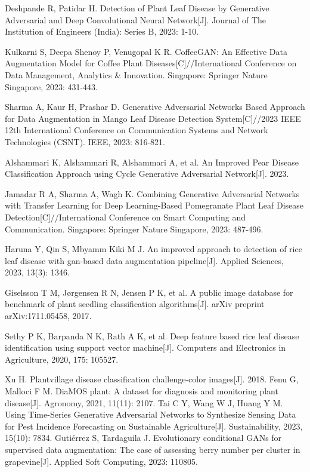 \documentclass[preprint,12pt,authoryear]{elsarticle}
\begin{document}
\begin{thebibliography}{00}
 Deshpande R, Patidar H. Detection of Plant Leaf Disease by Generative Adversarial and Deep Convolutional Neural Network[J]. Journal of The Institution of Engineers (India): Series B, 2023: 1-10.

 Kulkarni S, Deepa Shenoy P, Venugopal K R. CoffeeGAN: An Effective Data Augmentation Model for Coffee Plant Diseases[C]//International Conference on Data Management, Analytics \& Innovation. Singapore: Springer Nature Singapore, 2023: 431-443.

 Sharma A, Kaur H, Prashar D. Generative Adversarial Networks Based Approach for Data Augmentation in Mango Leaf Disease Detection System[C]//2023 IEEE 12th International Conference on Communication Systems and Network Technologies (CSNT). IEEE, 2023: 816-821.

 Alshammari K, Alshammari R, Alshammari A, et al. An Improved Pear Disease Classification Approach using Cycle Generative Adversarial Network[J]. 2023.

 Jamadar R A, Sharma A, Wagh K. Combining Generative Adversarial Networks with Transfer Learning for Deep Learning-Based Pomegranate Plant Leaf Disease Detection[C]//International Conference on Smart Computing and Communication. Singapore: Springer Nature Singapore, 2023: 487-496.

 Haruna Y, Qin S, Mbyamm Kiki M J. An improved approach to detection of rice leaf disease with gan-based data augmentation pipeline[J]. Applied Sciences, 2023, 13(3): 1346.

 Giselsson T M, Jørgensen R N, Jensen P K, et al. A public image database for benchmark of plant seedling classification algorithms[J]. arXiv preprint arXiv:1711.05458, 2017.

 Sethy P K, Barpanda N K, Rath A K, et al. Deep feature based rice leaf disease identification using support vector machine[J]. Computers and Electronics in Agriculture, 2020, 175: 105527.

 Xu H. Plantvillage disease classification challenge-color images[J]. 2018.
 Fenu G, Malloci F M. DiaMOS plant: A dataset for diagnosis and monitoring plant disease[J]. Agronomy, 2021, 11(11): 2107.
 Tai C Y, Wang W J, Huang Y M. Using Time-Series Generative Adversarial Networks to Synthesize Sensing Data for Pest Incidence Forecasting on Sustainable Agriculture[J]. Sustainability, 2023, 15(10): 7834.
 Gutiérrez S, Tardaguila J. Evolutionary conditional GANs for supervised data augmentation: The case of assessing berry number per cluster in grapevine[J]. Applied Soft Computing, 2023: 110805.


\end{thebibliography}
\end{document}
